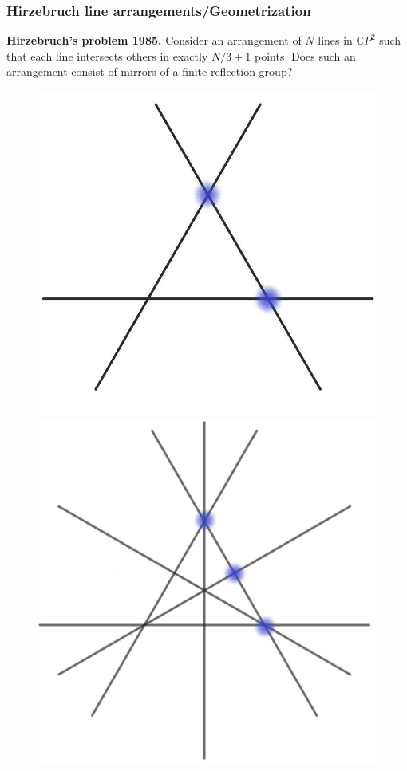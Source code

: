 \documentclass{beamer}
\begin{document}
\begin{frame}
	\frametitle{Hirzebruch line arrangements/Geometrization}
	
	{\bf Hirzebruch's problem 1985.} Consider an arrangement of \(N\) lines in $\mathbb CP^2$ such that each line intersects others in exactly \(N/3 + 1\) points. Does such an arrangement consist of mirrors of a finite reflection group?
	
	\vspace{-1mm}
	\begin{figure}[!h]
		\includegraphics[scale=.1]{Hirzebruch1}
		\includegraphics[scale=.1]{Hirzebruch2}

\end{figure}
\end{frame}
\end{document}
